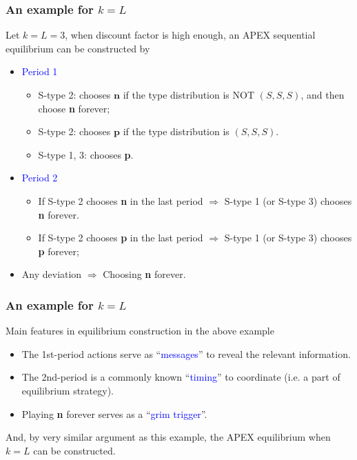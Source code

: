 \documentclass[9pt]{beamer}
\begin{document}
\begin{frame}
  \frametitle{An example for $k=L$}
\begin{center}
\end{center}

  
Let \alert{$k=L=3$}, when discount factor is high enough, an APEX sequential equilibrium can be constructed by
\begin{itemize}

\item \textcolor{blue}{Period 1} \pause 
\begin{itemize}
\item S-type 2: chooses $\textbf{n}$ if the type distribution is NOT $(S,S,S)$, and then choose \alert{\textbf{n} forever}; \pause 
\item S-type 2: chooses $\textbf{p}$ if the type distribution is $(S,S,S)$. \pause 
\item S-type 1, 3: chooses \textbf{p}.
\end{itemize}
\pause
\item \textcolor{blue}{Period 2}
\begin{itemize}
\item If S-type 2 chooses \textbf{n} in the last period $\Rightarrow$ S-type 1 (or S-type 3) chooses \alert{\textbf{n} forever}.
\item If S-type 2 chooses \textbf{p} in the last period $\Rightarrow$ S-type 1 (or S-type 3) chooses \textbf{p} forever; 
\end{itemize}
 
 \item Any deviation $\Rightarrow$ Choosing \alert<1->{\textbf{n} forever}.
\end{itemize}

\end{frame}


\begin{frame}
  \frametitle{An example for $k=L$}
Main features in equilibrium construction in the above example
\begin{itemize}
\item The \alert{1st-period} actions serve as ``\textcolor{blue}{messages}'' to reveal the relevant information.
\item The \alert{2nd-period} is a commonly known ``\textcolor{blue}{timing}'' to coordinate (i.e. a part of equilibrium strategy).
\item \alert{Playing \textbf{n} forever} serves as a ``\textcolor{blue}{grim trigger}''.
\end{itemize} 

And, by very similar argument as this example, the APEX equilibrium when $k=L$ can be constructed. 
\end{frame}
\end{document}

